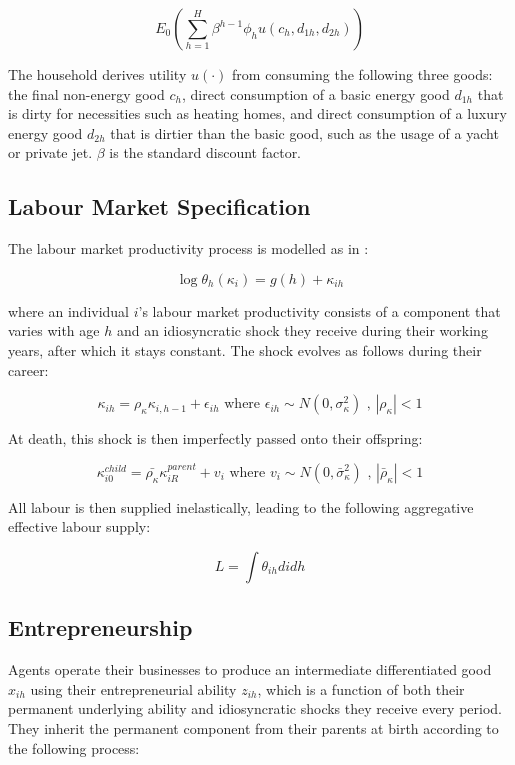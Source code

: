 \documentclass[12pt,a4paper]{article}
\begin{document}
\begin{equation}
E_0(\sum_{h=1}^{H}\beta^{h-1}\phi_h u(c_h,d_{1h}, d_{2h})) 
\end{equation}

 The household derives utility $u(\cdot)$ from consuming the following three goods:  the final non-energy good $c_h$, direct consumption of a basic energy good $d_{1h}$  that is dirty for necessities such as heating homes, and direct consumption of a luxury energy good $d_{2h}$ that is dirtier than the basic good, such as the usage of a yacht or private jet. $\beta$ is the standard discount factor.

\subsection{\normalsize Labour Market Specification}

The labour market productivity process is modelled as in \cite{joe}: 

\begin{equation} 
\log \theta_{h}(\kappa_i)= g(h) + \kappa_{ih}
\end{equation} 

where an individual $i$'s labour market productivity consists of a component that varies with age $h$ and an idiosyncratic shock they receive during their working years, after which it stays constant. The shock evolves as follows during their career:


 \[\kappa_{ih}=\rho_{\kappa} \kappa_{i,h-1}+\epsilon_{ih} \text{ where } \epsilon_{ih} \sim N(0, \sigma_{\kappa}^2) \text{ , } |\rho_{\kappa}| < 1 \]

 At death, this shock is then imperfectly passed onto their offspring:

 \[ \kappa_{i0}^{child}=\bar{\rho_{\kappa}} \kappa_{iR}^{parent}+v_{i} \text{ where } v_i \sim N(0, \bar{\sigma}_{\kappa}^2) \text{ , } |\bar{\rho}_{\kappa}| < 1\]

All labour is then supplied inelastically, leading to the following aggregative effective labour supply:

\begin{equation}
L=\int \theta_{ih} didh
\end{equation}

\subsection{\normalsize Entrepreneurship}
\hspace*{6mm} Agents operate their businesses to produce an intermediate differentiated good $x_{ih}$ using their entrepreneurial ability $z_{ih}$, which is a function of both their permanent underlying ability and idiosyncratic shocks they receive every period. They inherit the permanent component from their parents at birth according to the following process: 
\end{document}
